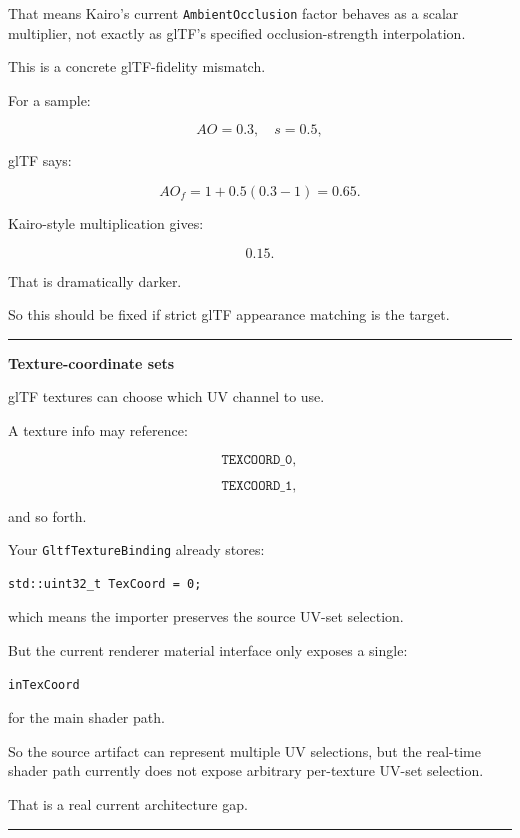 That means Kairo's current \texttt{AmbientOcclusion} factor behaves as a scalar multiplier, not exactly as glTF's specified occlusion-strength interpolation.

This is a concrete glTF-fidelity mismatch.

For a sample:

\[
AO=0.3,
\quad
s=0.5,
\]

glTF says:

\[
AO_f=
1+0.5(0.3-1)
=
0.65.
\]

Kairo-style multiplication gives:

\[
0.15.
\]

That is dramatically darker.

So this should be fixed if strict glTF appearance matching is the target.

\begin{center}\rule{0.5\linewidth}{0.5pt}\end{center}

\textbf{Texture-coordinate sets}

glTF textures can choose which UV channel to use.

A texture info may reference:

\[
\texttt{TEXCOORD\_0},
\]

\[
\texttt{TEXCOORD\_1},
\]

and so forth.

Your \texttt{GltfTextureBinding} already stores:

\begin{verbatim}
std::uint32_t TexCoord = 0;
\end{verbatim}

which means the importer preserves the source UV-set selection.

But the current renderer material interface only exposes a single:

\begin{verbatim}
inTexCoord
\end{verbatim}

for the main shader path.

So the source artifact can represent multiple UV selections, but the real-time shader path currently does not expose arbitrary per-texture UV-set selection.

That is a real current architecture gap.

\begin{center}\rule{0.5\linewidth}{0.5pt}\end{center}

